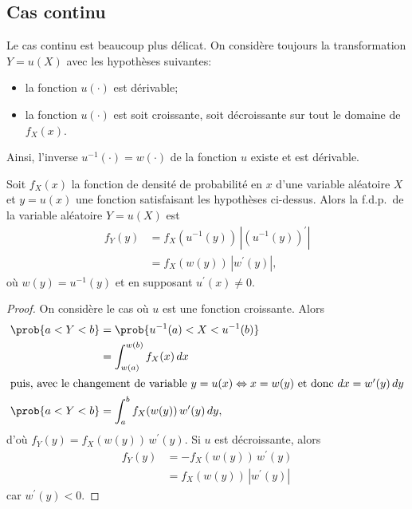 \subsection{Cas continu}

Le cas continu est beaucoup plus délicat. On considère toujours la
transformation $Y = u(X)$ avec les hypothèses suivantes:
\begin{itemize}
\item la fonction $u(\cdot)$ est dérivable;
\item la fonction $u(\cdot)$ est soit croissante, soit décroissante
  sur tout le domaine de $f_X(x)$.
\end{itemize}
Ainsi, l'inverse $u^{-1}(\cdot) = w(\cdot)$ de la fonction $u$ existe
et est dérivable.

\begin{thm}
  \label{thm:transformations:trans_simple}
  Soit $f_X(x)$ la fonction de densité de probabilité en $x$ d'une
  variable aléatoire $X$ et $y = u(x)$ une fonction satisfaisant les
  hypothèses ci-dessus. Alors la f.d.p.\ de la variable aléatoire $Y =
  u(X)$ est
  \begin{align*}
    f_Y(y)
    &= f_X(u^{-1}(y))\, |(u^{-1}(y))^\prime| \\
    &= f_X(w(y))\, |w^\prime(y)|,
  \end{align*}
  où $w(y) = u^{-1}(y)$ et en supposant $u^\prime(x) \neq 0$.
\end{thm}
\begin{proof}
  On considère le cas où $u$ est une fonction croissante. Alors
  \begin{align*}
    \prob{a < Y < b}
    &= \prob{u^{-1}(a) < X < u^{-1}(b)} \\
    &= \int_{w(a)}^{w(b)} f_X(x)\, dx \\
    \intertext{puis, avec le changement de variable $y = u(x)
      \Leftrightarrow x = w(y)$ et donc $dx = w^\prime(y)\, dy$}
    \prob{a < Y < b}
    &= \int_a^b f_X(w(y))\, w^\prime(y)\, dy,
  \end{align*}
  d'où $f_Y(y) = f_X(w(y))\, w^\prime(y)$. Si $u$ est décroissante,
  alors
  \begin{align*}
    f_Y(y)
    &= - f_X(w(y))\, w^\prime(y) \\
    &= f_X(w(y))\, |w^\prime(y)|
  \end{align*}
  car $w^\prime(y) < 0$.
\end{proof}

